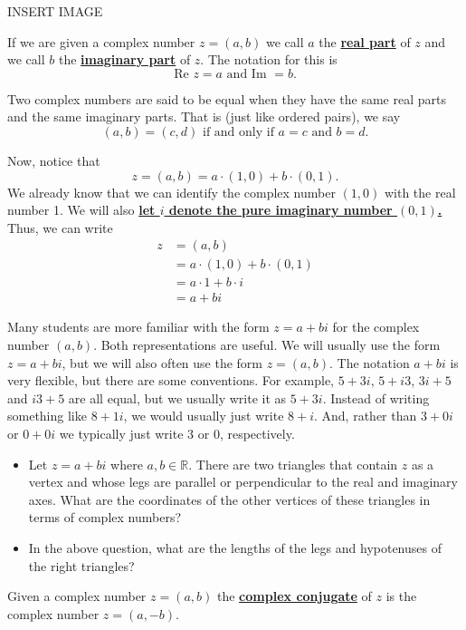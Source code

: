 \documentclass[11pt]{article}
\newenvironment{task}
	{\begin{mdframed}[linecolor=lightgray, linewidth=3pt]\raggedright}
	{\end{mdframed}}
\renewcommand\emph[1]{\underline{\bf{#1}}} %
\theoremstyle{definition}
\begin{document}
\begin{center}
  INSERT IMAGE
\end{center}

If we are given a complex number $z=(a,b)$ we call $a$ the \emph{real part} of $z$ and we call $b$ the \emph{imaginary part} of $z$. The 
notation for this is 
\[ \text{Re }z = a \text{ and } \text{Im }=b.\]

Two complex numbers are said to be equal when they have the same real parts and the same imaginary parts. That is (just like ordered pairs), we say
\[ (a,b) = (c,d) \text{ if and only if } a=c \text{ and } b=d. \]

Now, notice that
\[ z = (a,b) = a \cdot (1,0) + b \cdot (0,1). \]
We already know that we can identify the complex number $(1,0)$ with the real number 1. We will also \emph{let $i$ denote the pure imaginary number $(0,1)$.}
Thus, we can write
\begin{align*}
 z &= (a,b)\\ 
   &= a \cdot (1,0) + b \cdot (0,1)\\
   &= a\cdot 1 + b\cdot i\\
   &= a + bi
\end{align*}

Many students are more familiar with the form $z = a + bi$ for the complex number $(a,b)$. Both representations are useful. We will usually
use the form $z = a+bi$, but we will also often use the form $z=(a,b)$. The notation $a+bi$ is very flexible, but there are some conventions. For example,
$5+3i$, $5+i3$, $3i+5$ and $i3+5$ are all equal, but we usually write it as $5+3i$. Instead of writing something like $8+1i$, we would usually 
just write $8+i$. And, rather than $3+0i$ or $0+0i$ we typically just write $3$ or $0$, respectively.

\begin{task}
  \begin{itemize}
    \item Let $z=a+bi$ where $a,b\in \mathbb{R}$. There are two triangles that contain $z$ as a vertex and whose legs are parallel or perpendicular to the real and imaginary
  axes. What are the coordinates of the other vertices of these triangles in terms of complex numbers?
  \item In the above question, what are the lengths of the legs and hypotenuses of the right triangles?
  \end{itemize}
\end{task}

Given a complex number $z=(a,b)$ the \emph{complex conjugate} of $z$ is the complex number $z=(a,-b)$.
\end{document}
